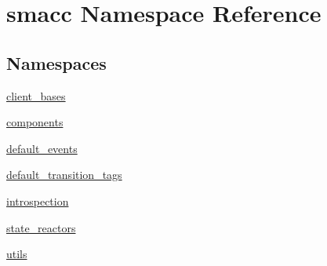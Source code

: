 \hypertarget{namespacesmacc}{}\section{smacc Namespace Reference}
\label{namespacesmacc}
\subsection*{Namespaces}
\begin{DoxyCompactItemize}
\item 
 \hyperlink{namespacesmacc_1_1client__bases}{client\+\_\+bases}
\item 
 \hyperlink{namespacesmacc_1_1components}{components}
\item 
 \hyperlink{namespacesmacc_1_1default__events}{default\+\_\+events}
\item 
 \hyperlink{namespacesmacc_1_1default__transition__tags}{default\+\_\+transition\+\_\+tags}
\item 
 \hyperlink{namespacesmacc_1_1introspection}{introspection}
\item 
 \hyperlink{namespacesmacc_1_1state__reactors}{state\+\_\+reactors}
\item 
 \hyperlink{namespacesmacc_1_1utils}{utils}
\end{DoxyCompactItemize}
